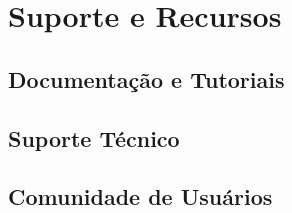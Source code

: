 \chapter{Suporte e Recursos}
\label{chap:suporte-e-recursos}

\section{Documentação e Tutoriais}
\label{sec:documentacao-e-tutoriais}

\lipsum[1-2]

\section{Suporte Técnico}
\label{sec:suporte-tecnico}

\lipsum[1-2]

\section{Comunidade de Usuários}
\label{sec:comunidade-de-usuarios}

\lipsum[1-2]

